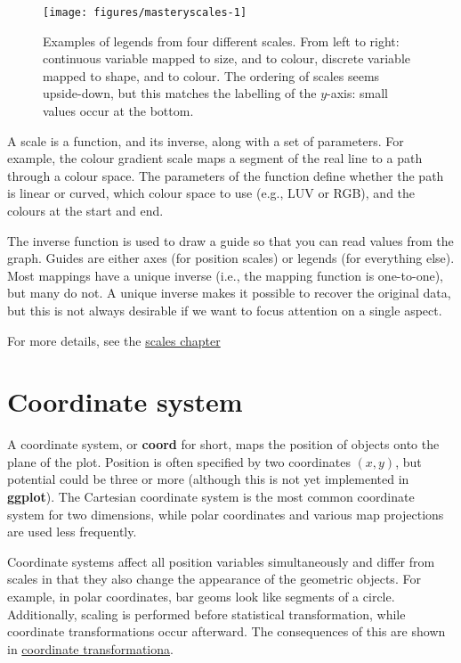 \begin{figure}

{\centering \texttt{[image: figures/masteryscales-1]} 

}

\caption{Examples of legends from four different scales. From left to right: continuous variable mapped to size, and to colour, discrete variable mapped to shape, and to colour. The ordering of scales seems upside-down, but this matches the labelling of the $y$-axis: small values occur at the bottom.\label{fig:scales}}
\end{figure}

A scale is a function, and its inverse, along with a set of parameters.
For example, the colour gradient scale maps a segment of the real line
to a path through a colour space. The parameters of the function define
whether the path is linear or curved, which colour space to use (e.g.,
LUV or RGB), and the colours at the start and end.

The inverse function is used to draw a guide so that you can read values
from the graph. Guides are either axes (for position scales) or legends
(for everything else). Most mappings have a unique inverse (i.e., the
mapping function is one-to-one), but many do not. A unique inverse makes
it possible to recover the original data, but this is not always
desirable if we want to focus attention on a single aspect.

For more details, see the \hyperref[cha:scales]{scales chapter}

\section{Coordinate system}\label{sec:coordinate-systems}

A coordinate system, or \textbf{coord} for short, maps the position of
objects onto the plane of the plot. Position is often specified by two
coordinates $(x, y)$, but potential could be three or more (although
this is not yet implemented in \textbf{ggplot}). The Cartesian
coordinate system is the most common coordinate system for two
dimensions, while polar coordinates and various map projections are used
less frequently. 

Coordinate systems affect all position variables simultaneously and
differ from scales in that they also change the appearance of the
geometric objects. For example, in polar coordinates, bar geoms look
like segments of a circle. Additionally, scaling is performed before
statistical transformation, while coordinate transformations occur
afterward. The consequences of this are shown in
\hyperref[sub:coord-transformation]{coordinate transformationa}.

